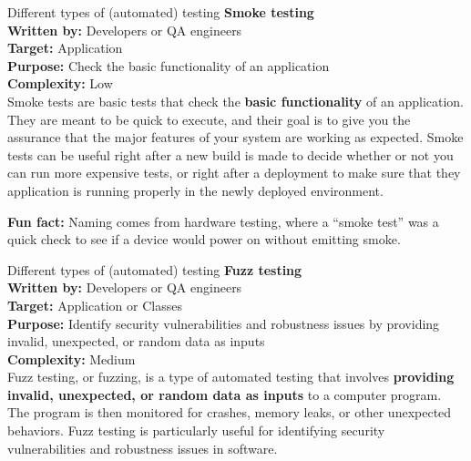 \documentclass[
  ignorenonframetext,
  american,
  t,
  aspectratio=169]{beamer}
\begin{document}
\begin{frame}{Different types of (automated) testing}
\protect{}\label{different-types-of-automated-testing-2}
\textbf{Smoke testing}\\
\textbf{Written by:} Developers or QA engineers\\
\textbf{Target:} Application\\
\textbf{Purpose:} Check the basic functionality of an application\\
\textbf{Complexity:} Low\\
Smoke tests are basic tests that check the \textbf{basic functionality}
of an application. They are meant to be quick to execute, and their goal
is to give you the assurance that the major features of your system are
working as expected. Smoke tests can be useful right after a new build
is made to decide whether or not you can run more expensive tests, or
right after a deployment to make sure that they application is running
properly in the newly deployed environment.

\textbf{Fun fact:} Naming comes from hardware testing, where a “smoke
test” was a quick check to see if a device would power on without
emitting smoke.
\end{frame}

\begin{frame}{Different types of (automated) testing}
\protect{}\label{different-types-of-automated-testing-3}
\textbf{Fuzz testing}\\
\textbf{Written by:} Developers or QA engineers\\
\textbf{Target:} Application or Classes\\
\textbf{Purpose:} Identify security vulnerabilities and robustness
issues by providing invalid, unexpected, or random data as inputs\\
\textbf{Complexity:} Medium\\
Fuzz testing, or fuzzing, is a type of automated testing that involves
\textbf{providing invalid, unexpected, or random data as inputs} to a
computer program. The program is then monitored for crashes, memory
leaks, or other unexpected behaviors. Fuzz testing is particularly
useful for identifying security vulnerabilities and robustness issues in
software.
\end{frame}
\end{document}
